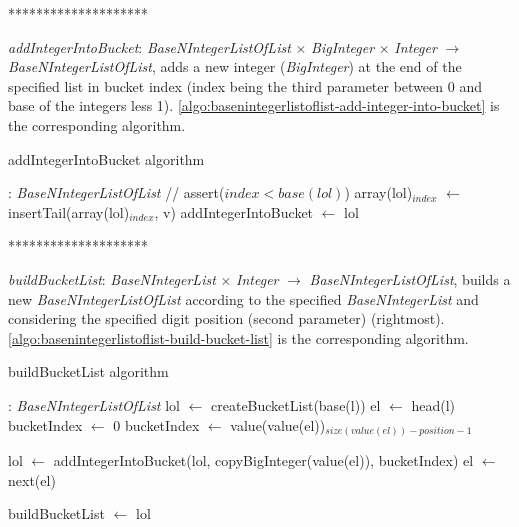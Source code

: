\documentclass[book, nodocumentinfo]{upmethodology-document}
\newcommand{\separator}{\centerline{********************}}
\begin{document}
\separator

\emph{addIntegerIntoBucket}: \emph{BaseNIntegerListOfList} \(×\) \emph{BigInteger} \(×\) \emph{Integer} \(\rightarrow\) \emph{BaseNIntegerListOfList},
adds a new integer (\emph{BigInteger}) at the end of the specified list in bucket index (index being the third parameter between 0 and base of the integers less 1).
\ref{algo:basenintegerlistoflist-add-integer-into-bucket} is the corresponding algorithm.

\begin{algorithm}[H]
    \caption{addIntegerIntoBucket algorithm}
    \label{algo:basenintegerlistoflist-add-integer-into-bucket}

    \begin{algorithmic}
         : \emph{BaseNIntegerListOfList}
            \State // assert(\(index < base(lol)\))
            \State array(lol)\(_{index}\) \(\leftarrow\) insertTail(array(lol)\(_{index}\), v)
            \State addIntegerIntoBucket \(\leftarrow\) lol
        \EndFunction
    \end{algorithmic}
\end{algorithm}

\separator

\emph{buildBucketList}: \emph{BaseNIntegerList} \(×\) \emph{Integer} \(\rightarrow\) \emph{BaseNIntegerListOfList},
builds a new \emph{BaseNIntegerListOfList} according to the specified \emph{BaseNIntegerList} and considering
the specified digit position (second parameter) (rightmost).
\ref{algo:basenintegerlistoflist-build-bucket-list} is the corresponding algorithm.

\begin{algorithm}[H]
    \caption{buildBucketList algorithm}
    \label{algo:basenintegerlistoflist-build-bucket-list}

    \begin{algorithmic}
         : \emph{BaseNIntegerListOfList}
            \State lol \(\leftarrow\) createBucketList(base(l))
            \State el \(\leftarrow\) head(l)
                \State bucketIndex \(\leftarrow\) 0
                    \State bucketIndex \(\leftarrow\) value(value(el))\(_{size(value(el)) - position - 1}\)
                \EndIf

                \State lol \(\leftarrow\) addIntegerIntoBucket(lol, copyBigInteger(value(el)), bucketIndex)
                \State el \(\leftarrow\) next(el)
            \EndWhile

            \State buildBucketList \(\leftarrow\) lol
        \EndFunction
    \end{algorithmic}
\end{algorithm}
\end{document}
